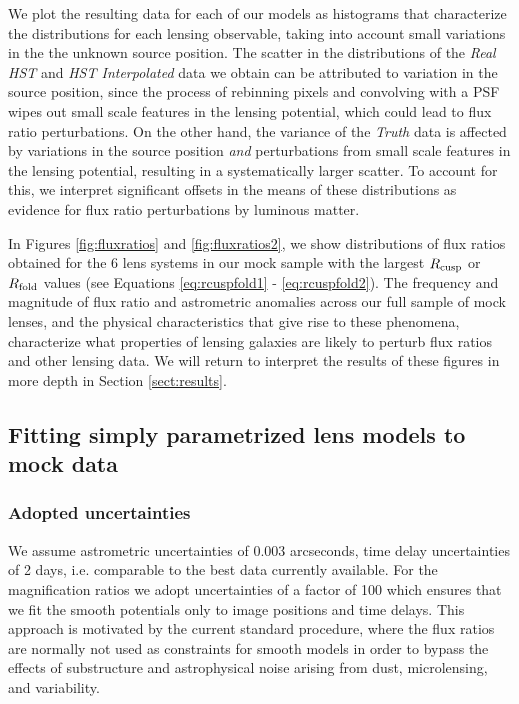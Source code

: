 We plot the resulting data for each of our models as histograms that characterize the distributions for each lensing observable, taking into account small variations in the the unknown source position. The scatter in the distributions of the \textit{Real HST} and \textit{HST Interpolated} data we obtain can be attributed to variation in the source position, since the process of rebinning pixels and convolving with a PSF wipes out small scale features in the lensing potential, which could lead to flux ratio perturbations. On the other hand, the variance of the \textit{Truth} data is affected by variations in the source position \textit{and} perturbations from small scale features in the lensing potential, resulting in a systematically larger scatter. To account for this, we interpret significant offsets in the means of these distributions as evidence for flux ratio perturbations by luminous matter.

In Figures \ref{fig:fluxratios} and \ref{fig:fluxratios2}, we show distributions of flux ratios obtained for the 6 lens systems in our mock sample with the largest $R_{\rm{cusp}}$ or $R_{\rm{fold}}$ values (see Equations \ref{eq:rcuspfold1} - \ref{eq:rcuspfold2}). The frequency and magnitude of flux ratio and astrometric anomalies across our full sample of mock lenses, and the physical characteristics that give rise to these phenomena, characterize what properties of lensing galaxies are likely to perturb flux ratios and other lensing data. We will return to interpret the results of these figures in more depth in Section \ref{sect:results}.

\subsection{Fitting simply parametrized lens models to mock data}
\label{sect:fitting}
\subsubsection{Adopted uncertainties}
We assume astrometric uncertainties of 0.003 arcseconds, time delay uncertainties of 2 days, i.e. comparable to the best data currently available. For the magnification ratios we adopt uncertainties of a factor of 100 which ensures that we fit the smooth potentials only to image positions and time delays. This approach is motivated by the current standard procedure, where the flux ratios are normally not used as constraints for smooth models in order to bypass the effects of substructure and astrophysical noise arising from dust, microlensing, and variability. 

